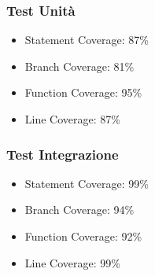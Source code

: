 \documentclass[12pt]{article}
\begin{document}
	\subsubsection{Test Unità}
	\begin{itemize}
		\item Statement Coverage: 87\%
		\item Branch Coverage: 81\%
		\item Function Coverage: 95\%
		\item Line Coverage: 87\%
	\end{itemize}
	\subsubsection{Test Integrazione}
	\begin{itemize}
		\item Statement Coverage: 99\%
		\item Branch Coverage: 94\%
		\item Function Coverage: 92\%
		\item Line Coverage: 99\%
	\end{itemize}
\end{document}
